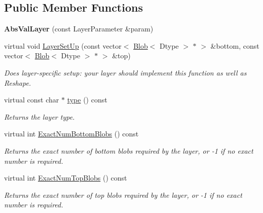 \subsection*{Public Member Functions}
\begin{DoxyCompactItemize}
\item 
{\bfseries Abs\+Val\+Layer} (const Layer\+Parameter \&param)\hypertarget{classcaffe_1_1AbsValLayer_a513c13552694e5860b85986b94793eb0}{}\label{classcaffe_1_1AbsValLayer_a513c13552694e5860b85986b94793eb0}

\item 
virtual void \hyperlink{classcaffe_1_1AbsValLayer_acfb0677a17e9d3b4920ff62d3b0d800a}{Layer\+Set\+Up} (const vector$<$ \hyperlink{classcaffe_1_1Blob}{Blob}$<$ Dtype $>$ $\ast$ $>$ \&bottom, const vector$<$ \hyperlink{classcaffe_1_1Blob}{Blob}$<$ Dtype $>$ $\ast$ $>$ \&top)
\begin{DoxyCompactList}\small\item\em Does layer-\/specific setup\+: your layer should implement this function as well as Reshape. \end{DoxyCompactList}\item 
virtual const char $\ast$ \hyperlink{classcaffe_1_1AbsValLayer_a35f8a7f7ae11e115f5bd5dac67abf555}{type} () const \hypertarget{classcaffe_1_1AbsValLayer_a35f8a7f7ae11e115f5bd5dac67abf555}{}\label{classcaffe_1_1AbsValLayer_a35f8a7f7ae11e115f5bd5dac67abf555}

\begin{DoxyCompactList}\small\item\em Returns the layer type. \end{DoxyCompactList}\item 
virtual int \hyperlink{classcaffe_1_1AbsValLayer_a0e797616508e76aa9c2ce19a1b08dff0}{Exact\+Num\+Bottom\+Blobs} () const 
\begin{DoxyCompactList}\small\item\em Returns the exact number of bottom blobs required by the layer, or -\/1 if no exact number is required. \end{DoxyCompactList}\item 
virtual int \hyperlink{classcaffe_1_1AbsValLayer_abddadbf826dc2ffaf22738804a484208}{Exact\+Num\+Top\+Blobs} () const 
\begin{DoxyCompactList}\small\item\em Returns the exact number of top blobs required by the layer, or -\/1 if no exact number is required. \end{DoxyCompactList}\end{DoxyCompactItemize}

